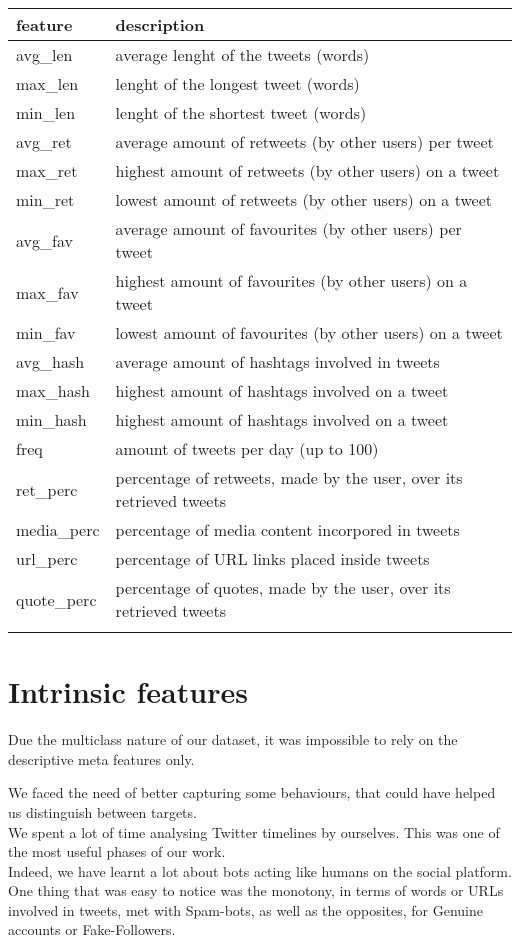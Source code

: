 \small
\begin{center}
	\begin{tabular}{ll}
		\\feature&description\\
		\hline\hline
		avg\_len&average lenght of the tweets (words)\\
		max\_len&lenght of the longest tweet (words)\\
		min\_len&lenght of the shortest tweet (words)\\
		avg\_ret&average amount of retweets (by other users) per tweet\\
		max\_ret&highest amount of retweets (by other users) on a tweet\\
		min\_ret&lowest amount of retweets (by other users) on a tweet\\
		avg\_fav&average amount of favourites (by other users) per tweet\\
		max\_fav&highest amount of favourites (by other users) on a tweet\\
		min\_fav&lowest amount of favourites (by other users) on a tweet\\
		avg\_hash&average amount of hashtags involved in tweets\\
		max\_hash&highest amount of hashtags involved on a tweet\\
		min\_hash&highest amount of hashtags involved on a tweet\\
		freq&amount of tweets per day (up to 100)\\
		ret\_perc&percentage of retweets, made by the user, over its retrieved tweets\\
		media\_perc&percentage of media content incorpored in tweets\\
		url\_perc&percentage of URL links placed inside tweets\\
		quote\_perc&percentage of quotes, made by the user, over its retrieved tweets\\\hline\\
	\end{tabular}
\end{center}
\normalsize

\section{Intrinsic features}
Due the multiclass nature of our dataset, it was impossible to rely on the descriptive meta features only.

We faced the need of better capturing some behaviours, that could have helped us distinguish between targets.\\
We spent a lot of time analysing Twitter timelines by ourselves. This was one of the most useful phases of our work.\\
Indeed, we have learnt a lot about bots acting like humans on the social platform.
One thing that was easy to notice was the monotony, in terms of words or URLs involved in tweets, met with Spam-bots, as well as the opposites, for Genuine accounts or Fake-Followers.

